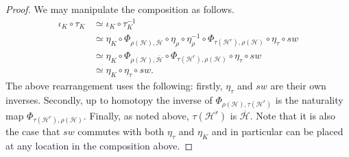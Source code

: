 \documentclass[10pt,a4paper]{amsart}
\newcommand{\cH}{\mathcal{H}}
\begin{document}
\begin{proof} We may manipulate the composition as follows.
%
\begin{align*} 
\iota_K \circ \tau_K &\simeq \iota_K \circ \tau_K^{-1} \\
						&\simeq \eta_K \circ \Phi_{\rho(\cH), \overline{\cH}} \circ \eta_{\rho} \circ \eta_{\rho}^{-1} \circ \Phi_{\tau(\cH^r), \rho(\cH)} \circ \eta_{\tau} \circ sw \\
						&\simeq \eta_K \circ \Phi_{\rho(\cH), \overline{\cH}} \circ \Phi_{\tau(\cH^r), \rho(\cH)} \circ \eta_{\tau} \circ sw \\
						&\simeq \eta_K \circ \eta_{\tau} \circ sw.
\end{align*}
%
The above rearrangement uses the following: firstly, $\eta_{\tau}$ and $sw$ are their own inverses. Secondly, up to homotopy the inverse of $\Phi_{\rho(\cH), \tau(\cH^r)}$ is the naturality map $\Phi_{\tau(\cH^r), \rho(\cH)}$. Finally, as noted above, $\tau(\cH^r)$ is $\overline{\cH}$. Note that it is also the case that $sw$ commutes with both $\eta_{\tau}$ and $\eta_K$ and in particular can be placed at any location in the composition above.
\end{proof}
\end{document}
